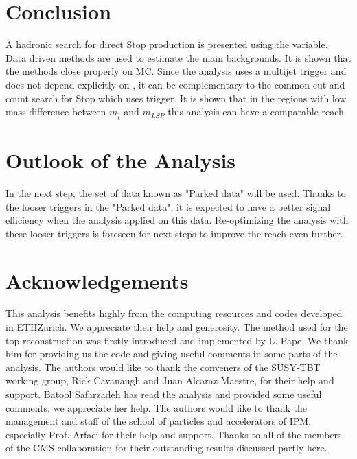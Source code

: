 \section{Conclusion}
\label{sect:conclusion}
A hadronic search for direct Stop production is presented using the \mttwo variable. Data driven methods are used to estimate the main
backgrounds. It is shown that the methods close properly on MC. Since the analysis uses a multijet trigger and \mttwo does not 
depend explicitly on \met, it can be complementary to the common cut and count search for Stop which uses \met trigger. 
It is shown that in the regions with low mass difference between $m_{\tilde{t}}$ and 
$m_{LSP}$ this analysis can have a comparable reach. 

\section{Outlook of the Analysis}
In the next step, 
the set of data known as "Parked data" will be used.
Thanks to the looser triggers in the "Parked data", 
it is expected to have a better signal efficiency when the analysis applied on this data. 
Re-optimizing the analysis with these looser triggers is foreseen for next steps to improve the reach even further.

\section{Acknowledgements}
This analysis benefits highly from the computing resources and codes developed in ETHZurich. 
We appreciate their help and generosity. The method used for the top reconstruction was firstly introduced and implemented by L. Pape. 
We thank him for providing us the code and giving useful comments in some parts of the analysis.
The authors would like to thank the conveners of the SUSY-TBT working group, Rick Cavanaugh 
and Juan Alcaraz Maestre, for their help and support. Batool Safarzadeh has read the analysis and provided some useful comments, we appreciate
her help.
The authors would like to thank the management and staff of the school of particles 
and accelerators of IPM, especially Prof. Arfaei for their help and support. Thanks to all of the members of
the CMS collaboration for their outstanding results discussed partly here.
